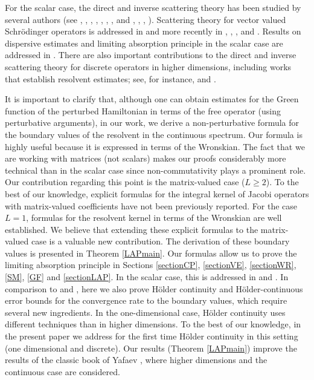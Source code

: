 \documentclass[12pt,oneside,onecolumn,open]{article}
\begin{document}
For the scalar case, the direct and inverse scattering theory has been studied by several authors (see \cite{MR332065}, \cite{MR405160}, \cite{MR454437}, \cite{MR559594}, \cite{MR499269}, \cite{MR708000}, \cite{MR730128}, and \cite{MR1896882}, \cite{MR2329923}, \cite{MR2404173}, \cite{MR2448988}). Scattering theory for vector valued Schr\"odinger operators is addressed in \cite{MR557790} and more recently in \cite{MR4959158}, \cite{MR4192212}, \cite{MR4385984}, and \cite{MR4760547}. Results on dispersive estimates and limiting absorption principle in the scalar case are addressed in \cite{MR3433284}.  There are also important contributions to the direct and inverse scattering theory for discrete operators in higher dimensions, including works that establish resolvent estimates; see, for instance, \cite{MR4018760} and \cite{MR2913620}.

It is important to clarify that, although one can obtain estimates for the Green function of the perturbed Hamiltonian in terms of the free operator (using perturbative arguments), in our work, we derive a non-perturbative formula for the boundary values of the resolvent in the continuous spectrum. Our formula is highly useful because it is expressed in terms of the Wronskian. The fact that we are working with matrices (not scalars) makes our proofs considerably more technical than in the scalar case since non-commutativity plays a prominent role. Our contribution regarding this point is the matrix-valued case ($L \geq 2$). To the best of our knowledge, explicit formulas for the integral kernel of Jacobi operators with matrix-valued coefficients have not been previously reported. For the case $L=1$, formulas for the resolvent kernel in terms of the Wronskian are well established. We believe that extending these explicit formulas to the matrix-valued case is a valuable new contribution. The derivation of these boundary values is presented in Theorem \ref{LAPmain}. Our formulas allow us to prove the limiting absorption principle in Sections \ref{sectionCP}, \ref{sectionVE}, \ref{sectionWR}, \ref{SM}, \ref{GF} and \ref{sectionLAP}. In the scalar case, this is addressed in \cite{MR3433284} and \cite{MR2529950}. In comparison to \cite{MR3433284} and \cite{MR2529950}, here we also prove H\"older continuity and H\"older-continuous error bounds for the convergence rate to the boundary values, which require several new ingredients. In the one-dimensional case, H\"older continuity uses different techniques than in higher dimensions. To the best of our knowledge, in the present paper we address for the first time H\"older continuity in this setting (one dimensional and discrete). Our results (Theorem \ref{LAPmain}) improve the results of the classic book of Yafaev \cite{MR2598115}, where higher dimensions and the continuous case are considered. 
\end{document}
